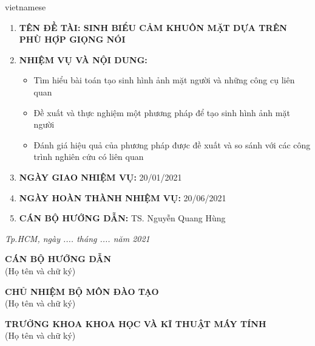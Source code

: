 \begin{titlepage}
\begin{otherlanguage*}{vietnamese}
\begin{flushleft}
        \renewcommand{\labelenumi}{\Roman{enumi}}
        \begin{enumerate}
            \item \textbf{TÊN ĐỀ TÀI: SINH BIỂU CẢM KHUÔN MẶT DỰA TRÊN PHÙ HỢP GIỌNG NÓI}
            \item \textbf{NHIỆM VỤ VÀ NỘI DUNG:}
            \begin{itemize}
                \item Tìm hiểu bài toán tạo sinh hình ảnh mặt người và những công cụ liên quan
                \item Đề xuất và thực nghiệm một phương pháp để tạo sinh hình ảnh mặt người
                \item Đánh giá hiệu quả của phương pháp được đề xuất và so sánh với các công trình nghiên cứu có liên quan
            \end{itemize}
            \item \textbf{NGÀY GIAO NHIỆM VỤ:} 20/01/2021
            \item \textbf{NGÀY HOÀN THÀNH NHIỆM VỤ:} 20/06/2021
            \item \textbf{CÁN BỘ HƯỚNG DẪN:} TS. Nguyễn Quang Hùng
        \end{enumerate}
    \end{flushleft}

    \begin{flushright}
        \textit{Tp.HCM, ngày .... tháng .... năm 2021}
    \end{flushright}

    \begin{center}
        \begin{minipage}[t]{0.40\textwidth}
            \center\textbf{CÁN BỘ HƯỚNG DẪN}\\
            (Họ tên và chữ ký)
            \vspace{3cm}
        \end{minipage}
        \noindent
        \begin{minipage}[t]{0.50\textwidth}
            \center\textbf{CHỦ NHIỆM BỘ MÔN ĐÀO TẠO}\\
            (Họ tên và chữ ký)
            \vspace{3cm}
        \end{minipage}
        \begin{minipage}[t]{0.90\textwidth}
            \center\textbf{TRƯỞNG KHOA KHOA HỌC VÀ KĨ THUẬT MÁY TÍNH}\\
            (Họ tên và chữ ký)
            \vspace{3cm}
        \end{minipage}
    \end{center}

\end{otherlanguage*}
\vfill
\end{titlepage}
